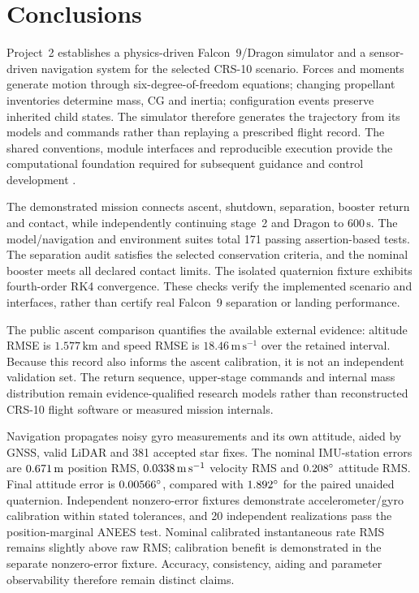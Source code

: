 \section{Conclusions}
\label{sec:conclusions}

Project~2 establishes a physics-driven Falcon~9/Dragon simulator and a sensor-driven navigation system for the selected CRS-10 scenario. Forces and moments generate motion through six-degree-of-freedom equations; changing propellant inventories determine mass, CG and inertia; configuration events preserve inherited child states. The simulator therefore generates the trajectory from its models and commands rather than replaying a prescribed flight record. The shared conventions, module interfaces and reproducible execution provide the computational foundation required for subsequent guidance and control development \cite[slides 2--4]{project2}.

The demonstrated mission connects ascent, shutdown, separation, booster return and contact, while independently continuing stage~2 and Dragon to $600\,\mathrm{s}$. The model/navigation and environment suites total 171 passing assertion-based tests. The separation audit satisfies the selected conservation criteria, and the nominal booster meets all declared contact limits. The isolated quaternion fixture exhibits fourth-order RK4 convergence. These checks verify the implemented scenario and interfaces, rather than certify real Falcon~9 separation or landing performance.

The public ascent comparison quantifies the available external evidence: altitude RMSE is $1.577\,\mathrm{km}$ and speed RMSE is $18.46\,\mathrm{m\,s^{-1}}$ over the retained interval. Because this record also informs the ascent calibration, it is not an independent validation set. The return sequence, upper-stage commands and internal mass distribution remain evidence-qualified research models rather than reconstructed CRS-10 flight software or measured mission internals.

Navigation propagates noisy gyro measurements and its own attitude, aided by GNSS, valid LiDAR and 381 accepted star fixes. The nominal IMU-station errors are $0.671\,\mathrm{m}$ position RMS, $0.0338\,\mathrm{m\,s^{-1}}$ velocity RMS and $0.208^\circ$ attitude RMS. Final attitude error is $0.00566^\circ$, compared with $1.892^\circ$ for the paired unaided quaternion. Independent nonzero-error fixtures demonstrate accelerometer/gyro calibration within stated tolerances, and 20 independent realizations pass the position-marginal ANEES test. Nominal calibrated instantaneous rate RMS remains slightly above raw RMS; calibration benefit is demonstrated in the separate nonzero-error fixture. Accuracy, consistency, aiding and parameter observability therefore remain distinct claims.

